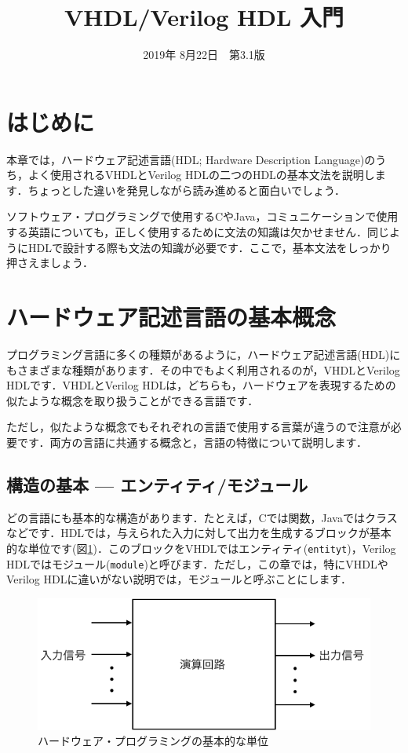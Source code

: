 \documentclass[a4paper,dvipdfmx]{jsarticle}
\begin{document}
\title{VHDL/Verilog HDL 入門}
\author{}
\date{2019年 8月22日~~第3.1版}
\maketitle

\section{はじめに}

本章では，ハードウェア記述言語(HDL; Hardware Description Language)のうち，よく使用されるVHDLとVerilog HDLの二つのHDLの基本文法を説明します．ちょっとした違いを発見しながら読み進めると面白いでしょう．

ソフトウェア・プログラミングで使用するCやJava，コミュニケーションで使用する英語についても，正しく使用するために文法の知識は欠かせません．同じようにHDLで設計する際も文法の知識が必要です．ここで，基本文法をしっかり押さえましょう．

\section{ハードウェア記述言語の基本概念}

プログラミング言語に多くの種類があるように，ハードウェア記述言語(HDL)にもさまざまな種類があります．その中でもよく利用されるのが，VHDLとVerilog HDLです．VHDLとVerilog HDLは，どちらも，ハードウェアを表現するための似たような概念を取り扱うことができる言語です．

ただし，似たような概念でもそれぞれの言語で使用する言葉が違うので注意が必要です．両方の言語に共通する概念と，言語の特徴について説明します．

\subsection{構造の基本 --- エンティティ/モジュール}

どの言語にも基本的な構造があります．たとえば，Cでは関数，Javaではクラスなどです．HDLでは，与えられた入力に対して出力を生成するブロックが基本的な単位です(図\ref{fig:design_unit})．このブロックをVHDLではエンティティ(\verb|entityt|)，Verilog HDLではモジュール(\verb|module|)と呼びます．ただし，この章では，特にVHDLやVerilog HDLに違いがない説明では，モジュールと呼ぶことにします．

 \begin{figure}[H]
  \begin{center}
   \includegraphics[width=.5\textwidth]{chapter02_figures/design_unit.png}
  \end{center}
  \caption{ハードウェア・プログラミングの基本的な単位 \label{fig:design_unit}}
 \end{figure}
\end{document}
